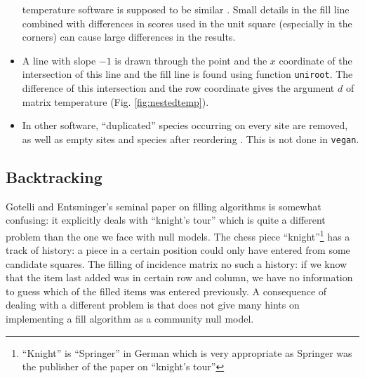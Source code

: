 \documentclass[a4paper,10pt]{amsart}
\begin{document}
\begin{itemize}
    temperature software \cite{AtmarPat93} is supposed to be similar
    \citep{RodGir06}. Small details in the fill line combined with
    differences in scores used in the unit square (especially in the
    corners) can cause large differences in the results.
  \item A line with slope $-1$ is drawn through the point and the $x$
    coordinate of the intersection of this line and the fill line is
    found using function \texttt{uniroot}. The difference of this
    intersection and the row coordinate gives the argument $d$ of matrix
    temperature (Fig. \ref{fig:nestedtemp}).
  \item In other software, ``duplicated'' species occurring on every
    site are removed, as well as empty sites and species after
    reordering \cite{RodGir06}. This is not done in \texttt{vegan}.
\end{itemize}

\subsection{Backtracking}

Gotelli and Entsminger's seminal paper \cite{GotelliEnt01} on filling
algorithms is somewhat confusing: it explicitly deals with ``knight's
tour'' which is quite a different problem than the one we face with
null models.  The chess piece ``knight''\footnote{``Knight'' is
  ``Springer'' in German which is very appropriate as Springer was the
  publisher of the paper on ``knight's tour''} has a track of history:
a piece in a certain position could only have entered from some
candidate squares. The filling of incidence matrix no such a history:
if we know that the item last added was in certain row and column, we
have no information to guess which of the filled items was entered
previously. A consequence of dealing with a different problem is that
\citet{GotelliEnt01} does not give many hints on implementing a fill
algorithm as a community null model.
\end{document}
